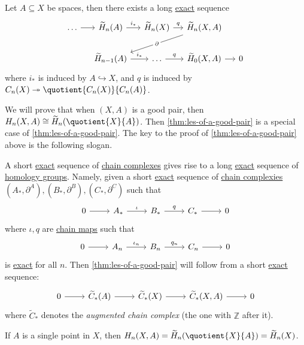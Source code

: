 \begin{theorem}\label{thm:long-exact-sequence-of-a-pair}
	Let \(A \subseteq X\) be spaces, then there exists a long \hyperref[def:exact]{exact} sequence
	\[
		\begin{tikzcd}[column sep=small]
			{\ldots} & {\widetilde{H}_n(A)} & {\widetilde{H}_n(X)} & {\widetilde{H}_n(X, A)} \\
			& {\widetilde{H}_{n-1}(A)} & \ldots & {\widetilde{H}_{0}(X, A)} & 0
			\arrow[from=1-1, to=1-2]
			\arrow["{i_\ast}", from=1-2, to=1-3]
			\arrow["q", from=1-3, to=1-4]
			\arrow[from=2-4, to=2-5]
			\arrow["{q}", from=2-3, to=2-4]
			\arrow["{i_\ast}", from=2-2, to=2-3]
			\arrow["{\partial}"{description}, from=1-4, to=2-2]
		\end{tikzcd}
	\]
	where \(i_\ast\) is induced by \(A\hookrightarrow X\), and \(q\) is induced by \(C_{n} (X)\twoheadrightarrow \quotient{C_{n} (X)}{C_{n} (A)}\).
\end{theorem}
We will prove that when \((X, A)\) is a good pair, then \(H_n(X, A) \cong \widetilde{H}_n(\quotient{X}{A})\). Then \autoref{thm:les-of-a-good-pair}
is a special case of \autoref{thm:les-of-a-good-pair}. The key to the proof of \autoref{thm:les-of-a-good-pair} above is the following slogan.

\begin{remark}
	A short \hyperref[def:exact]{exact} sequence of \hyperref[def:chain-complex]{chain complexes} gives rise to a long \hyperref[def:exact]{exact} sequence
	of \hyperref[def:homology-group]{homology groups}. Namely, given a short \hyperref[def:exact]{exact} sequence of \hyperref[def:chain-complex]{chain complexies}
	\((A_\ast, \partial^A), (B_\ast, \partial^B), (C_\ast, \partial^C)\) such that
	\[\begin{tikzcd}
			0 & {A_\ast} & {B_\ast} & {C_\ast} & 0
			\arrow[from=1-1, to=1-2]
			\arrow["\iota", from=1-2, to=1-3]
			\arrow["q", from=1-3, to=1-4]
			\arrow[from=1-4, to=1-5]
		\end{tikzcd}\]
	where \(\iota , q\) are \hyperref[def:chain-map]{chain maps} such that
	\[\begin{tikzcd}
			0 & {A_n} & {B_n} & {C_n} & 0
			\arrow[from=1-1, to=1-2]
			\arrow["\iota_{n}", from=1-2, to=1-3]
			\arrow["q_{n}", from=1-3, to=1-4]
			\arrow[from=1-4, to=1-5]
		\end{tikzcd}\]
	is \hyperref[def:exact]{exact} for all \(n\).
	Then \autoref{thm:les-of-a-good-pair} will
	follow from a short \hyperref[def:exact]{exact} sequence:
	\[\begin{tikzcd}
			0 & {\widetilde{C}_\ast(A)} & {\widetilde{C}_\ast(X)} & {\widetilde{C}_\ast(X, A)} & 0
			\arrow[from=1-1, to=1-2]
			\arrow[from=1-2, to=1-3]
			\arrow[from=1-3, to=1-4]
			\arrow[from=1-4, to=1-5]
		\end{tikzcd}\]
	where \(\widetilde{C}_\ast\) denotes the \emph{augmented chain complex} (the one with \(\mathbb{Z}\) after it).
\end{remark}

\begin{exercise}
	If \(A\) is a single point in \(X\), then \(H_n(X, A) = \widetilde{H}_n(\quotient{X}{A}) = \widetilde{H}_n(X)\).
\end{exercise}
